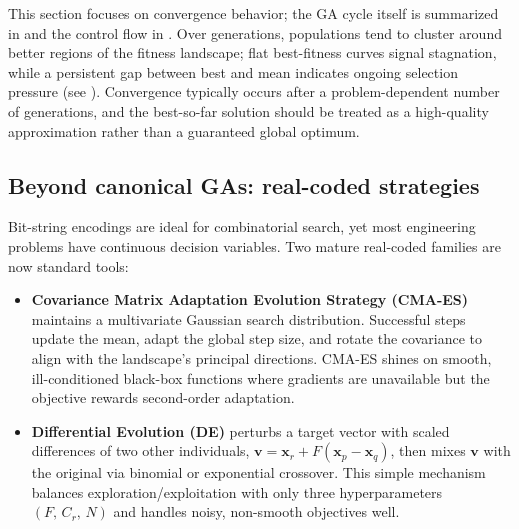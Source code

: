 This section focuses on convergence behavior; the GA cycle itself is summarized in  and the control flow in . Over generations, populations tend to cluster around better regions of the fitness landscape; flat best\hyp{}fitness curves signal stagnation, while a persistent gap between best and mean indicates ongoing selection pressure (see ). Convergence typically occurs after a problem\hyp{}dependent number of generations, and the best\hyp{}so\hyp{}far solution should be treated as a high\hyp{}quality approximation rather than a guaranteed global optimum.

\subsection{Beyond canonical GAs: real-coded strategies}
\label{sec:evo_beyond_canonical_gas_real_coded_strategies}

Bit-string encodings are ideal for combinatorial search, yet most engineering problems have continuous decision variables. Two mature real-coded families are now standard tools:

\begin{itemize}
    \item \textbf{Covariance Matrix Adaptation Evolution Strategy (CMA-ES)} \citep{Hansen2001} maintains a multivariate Gaussian search distribution. Successful steps update the mean, adapt the global step size, and rotate the covariance to align with the landscape's principal directions. CMA-ES shines on smooth, ill-conditioned black-box functions where gradients are unavailable but the objective rewards second-order adaptation.
    \item \textbf{Differential Evolution (DE)} \citep{Storn1997} perturbs a target vector with scaled differences of two other individuals, \(\mathbf{v} = \mathbf{x}_r + F(\mathbf{x}_p - \mathbf{x}_q)\), then mixes \(\mathbf{v}\) with the original via binomial or exponential crossover. This simple mechanism balances exploration/exploitation with only three hyperparameters \((F,\, C_r,\, N)\) and handles noisy, non-smooth objectives well.
\end{itemize}

